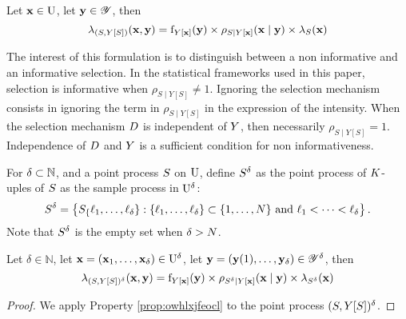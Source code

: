 \begin{property}\label{prop:owhlxjfeocl}
Let $\mathbf{x}\in\mathrm{U}$, let  $\mathbf{y}\in\mathscr{Y}$, then 
\begin{equation}
\lambda_{(S,Y[S])}(\mathbf{x},\mathbf{y})
=
\mathrm{f}_{Y[\mathbf{x}]}(\mathbf{y})\times \rho_{S\mid Y[\mathbf{x}]}(\mathbf{x}\mid\mathbf{y})\times \lambda_{S}(\mathbf{x})
\end{equation}
\end{property}


The interest of this formulation is to distinguish between a non informative and an informative selection.
In the statistical frameworks used in this paper, selection is informative when $\rho_{S\mid Y[S]}\neq 1$. Ignoring the selection mechanism consists in ignoring the term in $\rho_{S\mid Y[S]}$ in the expression of the intensity. When the selection mechanism $D$ is independent of $Y$, then necessarily $\rho_{S\mid Y[S]}=1$.
Independence of $D$ and $Y$ is a sufficient condition for non informativeness.

%

For $\delta\subset\mathbb{N}$, and a point process $S$ on $\mathrm{U}$, define $S^\delta$ as the 
point process of $K$-uples of $S$ as the sample process in $\mathrm{U}^\delta$:
$$S^\delta=\left\{S_\{\ell_1,\ldots,\ell_\delta\}:\{\ell_1,\ldots,\ell_\delta\}\subset\{1,\ldots,N\}\text{ and }\ell_1<\cdots<\ell_\delta\right\}.$$
Note that $S^\delta$ is the empty set when $\delta>N$.

\begin{corollary}\label{prop:owhlsdfxjfeocl}
Let $\delta\in\mathbb{N}$, let $\mathbf{x}=(\mathbf{x}_1,\ldots,\mathbf{x}_\delta)\in\mathrm{U}^\delta$, let  $\mathbf{y}=(\mathbf{y}(1),\ldots,\mathbf{y}_\delta)\in\mathscr{Y}^\delta$, then 
\begin{equation}
\lambda_{(S,Y[S])^\delta}(\mathbf{x},\mathbf{y})
=
\mathrm{f}_{Y[\mathbf{x}]}(\mathbf{y})\times \rho_{S^\delta\mid Y[\mathbf{x}]}(\mathbf{x}\mid\mathbf{y})\times \lambda_{S^\delta}(\mathbf{x})
\end{equation}
\end{corollary}
\begin{proof}
We apply Property \ref{prop:owhlxjfeocl} to the point process $(S,Y[S])^\delta$.
\end{proof}






